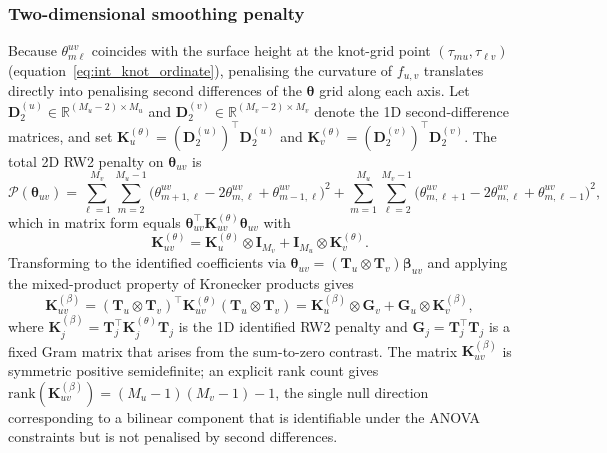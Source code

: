 \subsubsection{Two-dimensional smoothing penalty}\label{sec:int_penalty}
Because $\theta^{uv}_{m\ell}$ coincides with the surface height at the knot-grid point
$(\tau_{mu},\tau_{\ell v})$ (equation~\eqref{eq:int_knot_ordinate}), penalising the curvature
of $f_{u,v}$ translates directly into penalising second differences of the $\boldsymbol\theta$
grid along each axis. Let $\mathbf D_2^{(u)}\in\mathbb{R}^{(M_u-2)\times M_u}$ and
$\mathbf D_2^{(v)}\in\mathbb{R}^{(M_v-2)\times M_v}$ denote the 1D second-difference matrices,
and set
$\mathbf K_u^{(\theta)}=(\mathbf D_2^{(u)})^\top\mathbf D_2^{(u)}$ and
$\mathbf K_v^{(\theta)}=(\mathbf D_2^{(v)})^\top\mathbf D_2^{(v)}$. The total 2D RW2 penalty
on $\boldsymbol\theta_{uv}$ is
\[
\mathcal P(\boldsymbol\theta_{uv})
=\sum_{\ell=1}^{M_v}\sum_{m=2}^{M_u-1}\!\big(\theta^{uv}_{m+1,\ell}-2\theta^{uv}_{m,\ell}+\theta^{uv}_{m-1,\ell}\big)^2
+\sum_{m=1}^{M_u}\sum_{\ell=2}^{M_v-1}\!\big(\theta^{uv}_{m,\ell+1}-2\theta^{uv}_{m,\ell}+\theta^{uv}_{m,\ell-1}\big)^2,
\]
which in matrix form equals $\boldsymbol\theta_{uv}^\top\mathbf K_{uv}^{(\theta)}\boldsymbol\theta_{uv}$ with
\begin{equation}
\mathbf K_{uv}^{(\theta)}
=\mathbf K_u^{(\theta)}\otimes \mathbf I_{M_v}+\mathbf I_{M_u}\otimes \mathbf K_v^{(\theta)}.
\label{eq:K_theta_2d}
\end{equation}
Transforming to the identified coefficients via
$\boldsymbol\theta_{uv}=(\mathbf T_u\otimes\mathbf T_v)\boldsymbol\beta_{uv}$ and applying
the mixed-product property of Kronecker products gives
\begin{equation}
\mathbf K_{uv}^{(\beta)}
=(\mathbf T_u\otimes\mathbf T_v)^\top\mathbf K_{uv}^{(\theta)}(\mathbf T_u\otimes\mathbf T_v)
=\mathbf K_u^{(\beta)}\otimes \mathbf G_v+\mathbf G_u\otimes \mathbf K_v^{(\beta)},
\label{eq:K_beta_2d}
\end{equation}
where
$\mathbf K_j^{(\beta)}=\mathbf T_j^\top\mathbf K_j^{(\theta)}\mathbf T_j$ is the 1D identified
RW2 penalty and $\mathbf G_j=\mathbf T_j^\top\mathbf T_j$ is a fixed Gram matrix that arises
from the sum-to-zero contrast. The matrix $\mathbf K_{uv}^{(\beta)}$ is symmetric positive
semidefinite; an explicit rank count gives
$\mathrm{rank}(\mathbf K_{uv}^{(\beta)})=(M_u-1)(M_v-1)-1$, the single null direction
corresponding to a bilinear component that is identifiable under the ANOVA constraints but
is not penalised by second differences.

